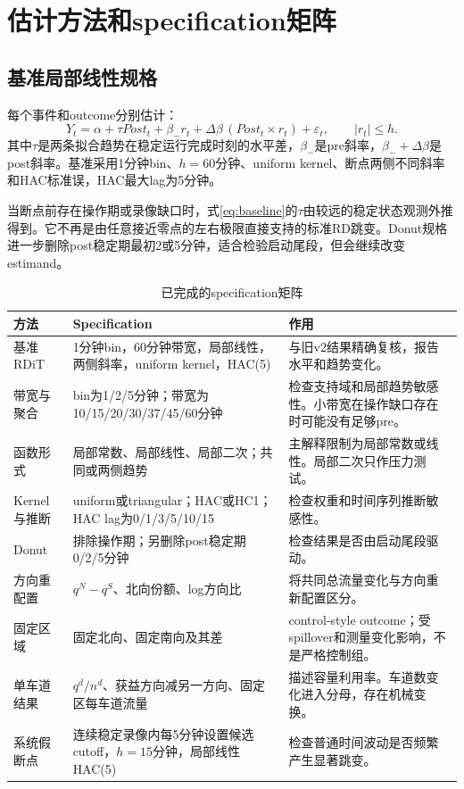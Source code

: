 \documentclass[11pt,a4paper]{ctexart}
\begin{document}
\section{估计方法和specification矩阵}

\subsection{基准局部线性规格}

每个事件和outcome分别估计：
\begin{equation}
Y_t=\alpha+\tau Post_t+\beta_-r_t+\Delta\beta\,(Post_t\times r_t)+\varepsilon_t,
\qquad |r_t|\leq h.
\label{eq:baseline}
\end{equation}
其中$\tau$是两条拟合趋势在稳定运行完成时刻的水平差，$\beta_-$是pre斜率，$\beta_-+\Delta\beta$是post斜率。基准采用1分钟bin、$h=60$分钟、uniform kernel、断点两侧不同斜率和HAC标准误，HAC最大lag为5分钟。

当断点前存在操作期或录像缺口时，式\eqref{eq:baseline}的$\tau$由较远的稳定状态观测外推得到。它不再是由任意接近零点的左右极限直接支持的标准RD跳变。Donut规格进一步删除post稳定期最初2或5分钟，适合检验启动尾段，但会继续改变estimand。

\begin{table}[H]
\centering
\caption{已完成的specification矩阵}
\label{tab:spec_matrix}
\begin{tabularx}{\textwidth}{p{}X X}
\toprule
方法 & Specification & 作用 \\
\midrule
基准RDiT & 1分钟bin，60分钟带宽，局部线性，两侧斜率，uniform kernel，HAC(5) & 与旧v2结果精确复核，报告水平和趋势变化。\\
带宽与聚合 & bin为1/2/5分钟；带宽为10/15/20/30/37/45/60分钟 & 检查支持域和局部趋势敏感性。小带宽在操作缺口存在时可能没有足够pre。\\
函数形式 & 局部常数、局部线性、局部二次；共同或两侧趋势 & 主解释限制为局部常数或线性。局部二次只作压力测试。\\
Kernel与推断 & uniform或triangular；HAC或HC1；HAC lag为0/1/3/5/10/15 & 检查权重和时间序列推断敏感性。\\
Donut & 排除操作期；另删除post稳定期0/2/5分钟 & 检查结果是否由启动尾段驱动。\\
方向重配置 & $q^N-q^S$、北向份额、log方向比 & 将共同总流量变化与方向重新配置区分。\\
固定区域 & 固定北向、固定南向及其差 & control-style outcome；受spillover和测量变化影响，不是严格控制组。\\
单车道结果 & $q^d/n^d$、获益方向减另一方向、固定区每车道流量 & 描述容量利用率。车道数变化进入分母，存在机械变换。\\
系统假断点 & 连续稳定录像内每5分钟设置候选cutoff，$h=15$分钟，局部线性HAC(5) & 检查普通时间波动是否频繁产生显著跳变。\\
\bottomrule
\end{tabularx}
\end{table}
\end{document}
